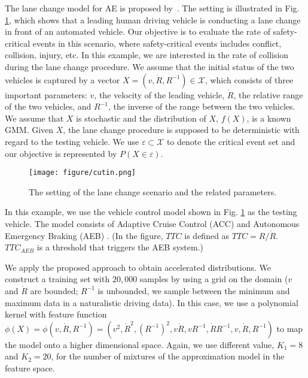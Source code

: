 \documentclass[letterpaper, 10 pt, journal]{IEEEtran}  %
\begin{document}
The lane change model for AE is proposed by~\cite{zhao2017accelerated}. The setting is illustrated in Fig. \ref{fig:lane_change}, which shows that a leading human driving vehicle is conducting a lane change in front of an automated vehicle. Our objective is to evaluate the rate of safety-critical events in this scenario, where safety-critical events includes conflict, collision, injury, etc. In this example, we are interested in the rate of collision during the lane change procedure. We assume that the initial status of the two vehicles is captured by a vector $X=(v,\dot{R},R^{-1}) \in \mathcal{X}$, which consists of three important parameters: $v$, the velocity of the leading vehicle, $\dot{R}$, the relative range of the two vehicles, and $R^{-1}$, the inverse of the range between the two vehicles. We assume that $X$ is stochastic and the distribution of $X$, $f(X)$, is a known GMM. Given $X$, the lane change procedure is supposed to be deterministic with regard to the testing vehicle. We use $\varepsilon \subset \mathcal{X}$ to denote the critical event set and our objective is represented by $P(X \in \varepsilon)$.

\begin{figure}[t]
	\centering
	\texttt{[image: figure/cutin.png]}
	\caption{The setting of the lane change scenario and the related parameters.}
	\label{fig:lane_change}
\end{figure}

In this example, we use the vehicle control model shown in Fig. \ref{fig:lane_change} as the testing vehicle. The model consists of Adaptive Cruise Control (ACC) and Autonomous Emergency Braking (AEB) \cite{ulsoy2012automotive}. (In the figure, $TTC$ is defined as $TTC=R/\dot{R}$. $TTC_{AEB}$ is a threshold that triggers the AEB system.)


We apply the proposed approach to obtain accelerated distributions. We construct a training set with $20,000$ samples by using a grid on the domain ($v$ and $\dot{R}$ are bounded; $R^{-1}$ is unbounded, we sample between the minimum and maximum data in a naturalistic driving data). In this case, we use a polynomial kernel with feature function $\phi(X)=\phi(v,\dot{R},R^{-1})=(v^2,\dot{R}^2,(R^{-1})^2,v\dot{R},vR^{-1},\dot{R}R^{-1},v,\dot{R},R^{-1})$ to map the model onto a higher dimensional space. Again, we use different value, $K_1=8$ and $K_2=20$, for the number of mixtures of the approximation model in the feature space.
\end{document}
